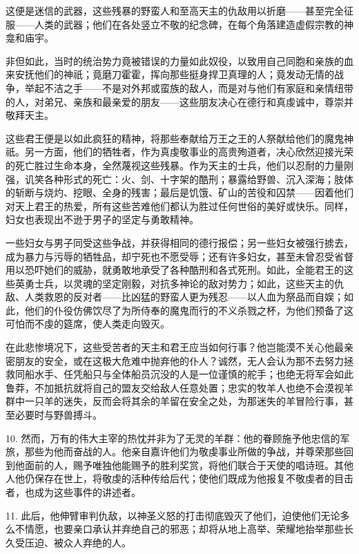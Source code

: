 这便是迷信的武器，这些残暴的野蛮人和至高天主的仇敌用以折磨——甚至完全征服——人类的武器；他们在各处竖立不敬的纪念碑，在每个角落建造虚假宗教的神龛和庙宇。\par

非但如此，当时的统治势力竟被错误的力量如此奴役，以致用自己同胞和亲族的血来安抚他们的神祇；竟磨刀霍霍，挥向那些挺身捍卫真理的人；竟发动无情的战争，举起不洁之手——不是对外邦或蛮族的敌人，而是对与他们有家庭和亲情纽带的人，对弟兄、亲族和最亲爱的朋友——这些朋友决心在德行和真虔诚中，尊崇并敬拜天主。\par

这些君王便是以如此疯狂的精神，将那些奉献给万王之王的人祭献给他们的魔鬼神祇。另一方面，他们的牺牲者，作为真虔敬事业的高贵殉道者，决心欣然迎接光荣的死亡胜过生命本身，全然蔑视这些残暴。作为天主的士兵，他们以忍耐的力量刚强，讥笑各种形式的死亡：火、剑、十字架的酷刑；暴露给野兽、沉入深海；肢体的斩断与烧灼、挖眼、全身的残害；最后是饥饿、矿山的苦役和囚禁——因着他们对天上君王的热爱，所有这些苦难他们都认为胜过任何世俗的美好或快乐。同样，妇女也表现出不逊于男子的坚定与勇敢精神。\par

一些妇女与男子同受这些争战，并获得相同的德行报偿；另一些妇女被强行掳去，成为暴力与污辱的牺牲品，却宁死也不愿受辱；还有许多妇女，甚至未曾忍受省督用以恐吓她们的威胁，就勇敢地承受了各种酷刑和各式死刑。如此，全能君王的这些英勇士兵，以灵魂的坚定刚毅，对抗多神论的敌对势力；如此，这些天主的仇敌、人类救恩的反对者——比凶猛的野蛮人更为残忍——以人血为祭品而自娱；如此，他们的仆役仿佛饮尽了为所侍奉的魔鬼而行的不义杀戮之杯，为他们预备了这可怕而不虔的筵席，使人类走向毁灭。\par

在此悲惨境况下，这些受苦者的天主和君王应当如何行事？他岂能漠不关心他最亲密朋友的安全，或在这极大危难中抛弃他的仆人？诚然，无人会认为那不去努力拯救同船水手、任凭船只与全体船员沉没的人是一位谨慎的舵手；也绝无将军会如此鲁莽，不加抵抗就将自己的盟友交给敌人任意处置；忠实的牧羊人也绝不会漠视羊群中一只羊的迷失，反而会将其余的羊留在安全之处，为那迷失的羊冒险行事，甚至必要时与野兽搏斗。\par

10. 然而，万有的伟大主宰的热忱并非为了无灵的羊群：他的眷顾施予他忠信的军旅，那些为他而奋战的人。他亲自嘉许他们为敬虔事业所做的争战，并尊荣那些回到他面前的人，赐予唯独他能赐予的胜利奖赏，将他们联合于天使的唱诗班。其他人他仍保存在世上，将敬虔的活种传给后代；使他们既成为他报复不敬虔者的目击者，也成为这些事件的讲述者。\par

11. 此后，他伸臂审判仇敌，以神圣义怒的打击彻底毁灭了他们，迫使他们无论多么不情愿，也要亲口承认并弃绝自己的邪恶；却将从地上高举、荣耀地抬举那些长久受压迫、被众人弃绝的人。\par

